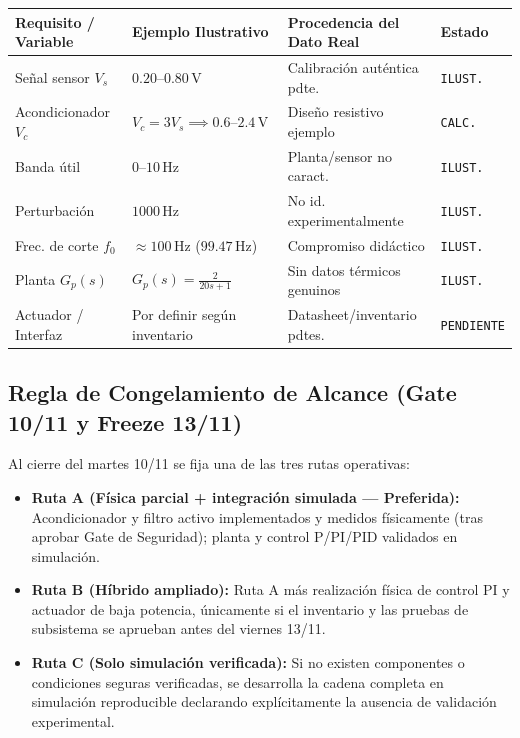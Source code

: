 \documentclass[11pt, a4paper]{article}
\begin{document}
\begin{center}
\begin{tabularx}{\textwidth}{@{} l X l l @{}}
\toprule
\textbf{Requisito / Variable} & \textbf{Ejemplo Ilustrativo} & \textbf{Procedencia del Dato Real} & \textbf{Estado} \\ \midrule
Señal sensor $V_s$ & $0.20\text{--}0.80\,\text{V}$ & Calibración auténtica pdte. & \texttt{ILUST.} \\
Acondicionador $V_c$ & $V_c=3V_s \implies 0.6\text{--}2.4\,\text{V}$ & Diseño resistivo ejemplo & \texttt{CALC.} \\
Banda útil & $0\text{--}10\,\text{Hz}$ & Planta/sensor no caract. & \texttt{ILUST.} \\
Perturbación & $1000\,\text{Hz}$ & No id. experimentalmente & \texttt{ILUST.} \\
Frec. de corte $f_0$ & $\approx 100\,\text{Hz}$ ($99.47\,\text{Hz}$) & Compromiso didáctico & \texttt{ILUST.} \\
Planta $G_p(s)$ & $G_p(s) = \frac{2}{20s + 1}$ & Sin datos térmicos genuinos & \texttt{ILUST.} \\
Actuador / Interfaz & Por definir según inventario & Datasheet/inventario pdtes. & \texttt{PENDIENTE} \\ \bottomrule
\end{tabularx}
\end{center}

\subsection{Regla de Congelamiento de Alcance (Gate 10/11 y Freeze 13/11)}
Al cierre del martes 10/11 se fija una de las tres rutas operativas:
\begin{itemize}[noitemsep]
    \item \textbf{Ruta A (Física parcial + integración simulada — Preferida):} Acondicionador y filtro activo implementados y medidos físicamente (tras aprobar Gate de Seguridad); planta y control P/PI/PID validados en simulación.
    \item \textbf{Ruta B (Híbrido ampliado):} Ruta A más realización física de control PI y actuador de baja potencia, únicamente si el inventario y las pruebas de subsistema se aprueban antes del viernes 13/11.
    \item \textbf{Ruta C (Solo simulación verificada):} Si no existen componentes o condiciones seguras verificadas, se desarrolla la cadena completa en simulación reproducible declarando explícitamente la ausencia de validación experimental.
\end{itemize}
\end{document}
